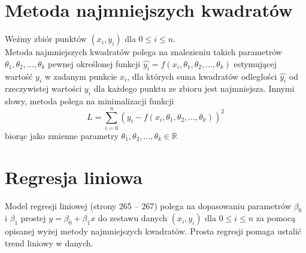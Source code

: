 \documentclass[inzynierska]{pwr_wmat_praca_dyplomowa}
\theoremstyle{plain}
\numberwithin{theorem}{chapter}
\theoremstyle{definition}
\numberwithin{theorem}{chapter}
\begin{document}
\section{Metoda najmniejszych kwadratów}
Weźmy zbiór punktów $(x_i, y_i)$ dla $0\leq i \leq n$.\\
Metoda najmniejszych kwadratów \cite{dekking2005modern} polega na znalezieniu takich parametrów $\theta_1, \theta_2, \dots, \theta_k$ pewnej określonej funkcji $\hat{y_i} = f\left(x_i, \theta_1, \theta_2, \dots, \theta_k \right)$ estymującej wartość $y_i$ w zadanym punkcie $x_i$, dla których suma kwadratów odległości $\hat{y_i}$ od rzeczywistej wartości $y_i$ dla każdego punktu ze zbioru jest najmniejsza. Innymi słowy, metoda polega na minimalizacji funkcji 
\begin{equation*}
	L = \sum_{i=0}^{n}(y_i-f\left(x_i, \theta_1, \theta_2, \dots, \theta_k \right))^2
\end{equation*}
biorąc jako zmienne parametry $ \theta_1, \theta_2, \dots, \theta_k \in \mathbb{R} $

\section{Regresja liniowa}
Model regresji liniowej \cite{statysty} (strony 265 -- 267) polega na dopasowaniu parametrów $\beta_0$ i $\beta_1$ prostej $y=\beta_0+\beta_1 x$ do zestawu danych $(x_i, y_i)$ dla $0\leq i \leq n$ za pomocą opisanej wyżej metody najmniejszych kwadratów. Prosta regresji pomaga ustalić trend liniowy w danych.
\end{document}
